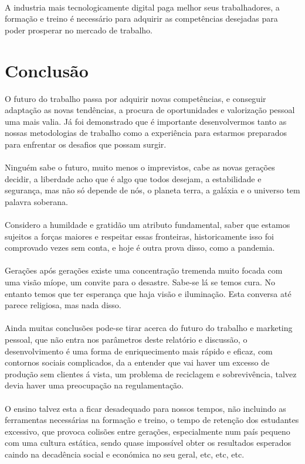 \\
A industria mais tecnologicamente digital paga melhor seus trabalhadores, a formação e treino é necessário para adquirir as competências desejadas para poder prosperar no mercado de trabalho.

\newpage
\section{Conclusão}
\qquad O futuro do trabalho passa por adquirir novas competências, e conseguir adaptação as novas tendências, a procura de oportunidades e valorização pessoal uma mais valia. Já foi demonstrado que é importante desenvolvermos tanto as nossas metodologias de trabalho como a experiência para estarmos preparados para enfrentar os desafios que possam surgir. \\
\\
Ninguém sabe o futuro, muito menos o imprevistos, cabe as novas gerações decidir, a liberdade acho que é algo que todos desejam, a estabilidade e segurança, mas não só depende de nós, o planeta terra, a galáxia e o universo tem palavra soberana.\\
\\
Considero a humildade e gratidão um atributo fundamental, saber que estamos sujeitos a forças maiores e respeitar essas fronteiras, historicamente isso foi comprovado vezes sem conta, e hoje é outra prova disso, como a pandemia.\\
\\
Gerações após gerações existe uma concentração tremenda muito focada com uma visão míope, um convite para o desastre. Sabe-se lá se temos cura. No entanto temos que ter esperança que haja visão e iluminação.
Esta conversa até parece religiosa, mas nada disso.\\
\\
Ainda muitas conclusões pode-se tirar acerca do futuro do trabalho e marketing pessoal, que não entra nos parâmetros deste relatório e discussão, o desenvolvimento é uma forma de enriquecimento mais rápido e eficaz, com contornos sociais complicados, da a entender que vai haver um excesso de produção sem clientes á vista, um problema de reciclagem e sobrevivência, talvez devia haver uma preocupação na  regulamentação.\\
\\
O ensino talvez esta a ficar desadequado para nossos tempos, não incluindo as ferramentas necessárias na formação e treino, o tempo de retenção dos estudantes excessivo, que provoca colisões entre gerações, especialmente num país pequeno com uma cultura estática, sendo quase impossível obter os resultados esperados caindo na decadência social e económica no seu geral, etc, etc, etc.\\
